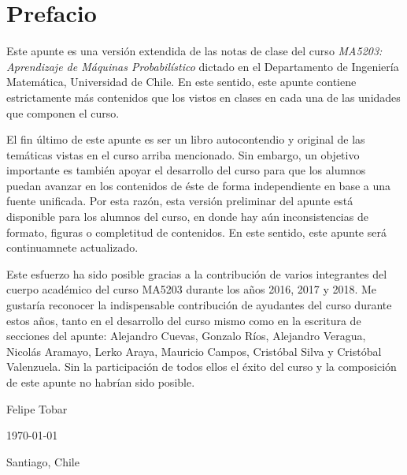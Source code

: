 \newpage
\section*{Prefacio}
Este apunte es una versión extendida de las notas de clase del curso \emph{MA5203: Aprendizaje de Máquinas Probabilístico} dictado en el Departamento de Ingeniería Matemática, Universidad de Chile. En este sentido, este apunte contiene estrictamente más contenidos que los vistos en clases en cada una de las unidades que componen el curso. 

El fin último de este apunte es ser un libro autocontendio y original de las temáticas vistas en el curso arriba mencionado. Sin embargo, un objetivo importante es también apoyar el desarrollo del curso para que los alumnos puedan avanzar en los contenidos de éste de forma independiente en base a una fuente unificada. Por esta razón, esta versión preliminar del apunte está disponible para los alumnos del curso, en donde hay aún inconsistencias de formato, figuras o completitud de contenidos. En este sentido, este apunte será continuamnete actualizado. 

Este esfuerzo ha sido posible gracias a la contribución de varios integrantes del cuerpo académico del curso MA5203 durante los años 2016, 2017 y 2018. Me gustaría reconocer la indispensable contribución de ayudantes del curso durante estos años, tanto en el desarrollo del curso mismo como en la escritura de secciones del apunte: Alejandro Cuevas, Gonzalo Ríos, Alejandro Veragua, Nicolás Aramayo, Lerko Araya, Mauricio Campos, Cristóbal Silva y Cristóbal Valenzuela. Sin la participación de todos ellos el éxito del curso y la composición de este apunte no habrían sido posible.


\bigskip
\begin{flushright}
  Felipe Tobar\par
  \today\par
  Santiago, Chile
\end{flushright}
\newpage

